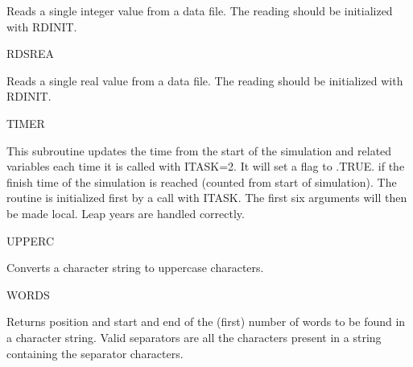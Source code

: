 \documentclass[11pt]{article}
\begin{document}
\begin{indenting}{2.54cm}
Reads a single integer value from a data file. The reading should be
initialized with RDINIT.
\end{indenting}
RDSREA
\testlastline

\begin{indenting}{2.54cm}
Reads a single real value from a data file. The reading should be initialized
with RDINIT.
\end{indenting}
TIMER
\testlastline

\begin{indenting}{2.54cm}
This subroutine updates the time from the start of the simulation and
related variables each time it is called with ITASK=2. It will set a flag to
.TRUE. if the finish time of the simulation is reached (counted from start
of simulation). The routine is initialized first by a call with ITASK. The
first six arguments will then be made local. Leap years are handled correct\-ly.
\end{indenting}
UPPERC
\testlastline

\begin{indenting}{2.54cm}
Converts a character string to uppercase characters.
\end{indenting}
WORDS
\testlastline

\begin{indenting}{2.54cm}
Returns position and start and end of the (first) number of words to be
found in a character string. Valid separators are all the characters present
in a string containing the separator characters. 
\end{indenting}
\end{document}
